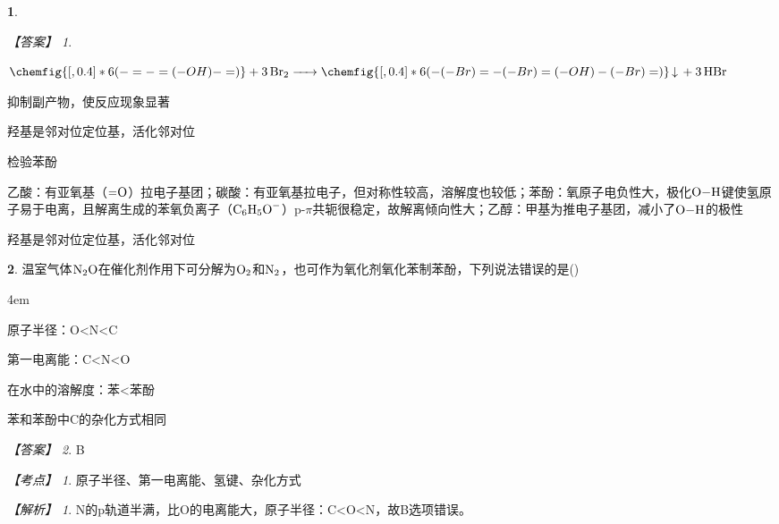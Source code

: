 \documentclass[UTF8, 10pt, a4paper, oneside]{ctexart}
\newcommand{\fs}[1]{{\fangsong #1}}%
\theoremstyle{definition}
\newtheorem{subexercise}{}[exercise]%
\theoremstyle{remark}
\newtheorem*{answer}{【答案】}
\newtheorem*{point}{【考点】}      %
\newtheorem*{explanation}{【解析】}     %
\theoremstyle{plain}
\begin{document}
\begin{subexercise}
\begin{answer}
\begin{inparaenum}
            \item $\chemfig{[,0.4] *6(-=-=(-OH)-=)}\ce{+ 3Br2 -> }\chemfig{[,0.4] *6(-(-Br)=-(-Br)=(-OH)-(-Br)=)}\ce{v + 3HBr}$
            \item 抑制副产物，使反应现象显著
            \item 羟基是邻对位定位基，活化邻对位
            \item 检验苯酚
            \item 乙酸：有亚氧基（$\ce{=O}$）拉电子基团；碳酸：有亚氧基拉电子，但对称性较高，溶解度也较低；苯酚：氧原子电负性大，极化$\ce{O-H}$键使氢原子易于电离，且解离生成的苯氧负离子（$\ce{C6H5O-}$）p-$\pi$共轭很稳定，故解离倾向性大；乙醇：甲基为推电子基团，减小了$\ce{O-H}$的极性
            \item 羟基是邻对位定位基，活化邻对位
        \end{inparaenum}
    \end{answer}
\end{subexercise}
\begin{subexercise}
    \fs{[2024甘肃卷]}温室气体$\ce{N2O}$在催化剂作用下可分解为$\ce{O2}$和$\ce{N2}$，也可作为氧化剂氧化苯制苯酚，下列说法错误的是\quad(\quad)
    \begin{adjustwidth}{4em}{}
        \begin{asparaenum}[A. ]
            \item 原子半径：O<N<C
            \item 第一电离能：C<N<O
            \item 在水中的溶解度：苯<苯酚
            \item 苯和苯酚中C的杂化方式相同
        \end{asparaenum}
    \end{adjustwidth}
    \begin{answer}
        B
    \end{answer}
    \begin{point}
        原子半径、第一电离能、氢键、杂化方式
    \end{point}
    \begin{explanation}
        N的p轨道半满，比O的电离能大，原子半径：C<O<N，故B选项错误。
    \end{explanation}
\end{subexercise}
\end{document}
